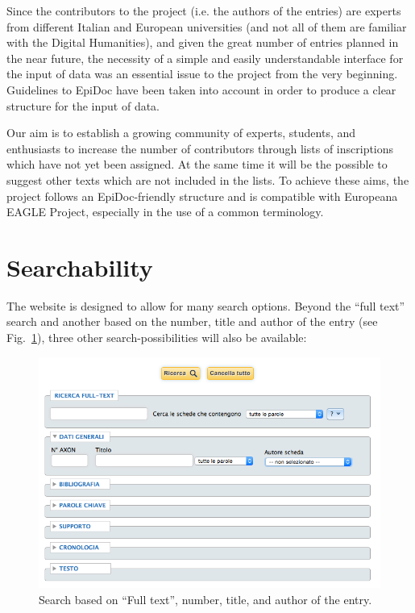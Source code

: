 \documentclass[amsthm,ebook]{saparticle}
\begin{document}
Since the contributors to the project (i.e. the authors of the entries) are experts from different Italian and European
universities (and not all of them are familiar with the Digital Humanities), and given the great number of entries
planned in the near future, the necessity of a simple and easily understandable interface for the input of data was an
essential issue to the project from the very beginning. Guidelines to EpiDoc have been taken into account in order to
produce a clear structure for the input of data.

Our aim is to establish a growing community of experts, students, and enthusiasts to increase the number of contributors
through lists of inscriptions which have not yet been assigned. At the same time it will be the possible to suggest
other texts which are not included in the lists. To achieve these aims, the project follows an EpiDoc-friendly
structure and is compatible with Europeana EAGLE Project, especially in the use of a common terminology. 







\section{Searchability}





The website is designed to allow for many search options. Beyond the ``full text'' search and another based on the number,
title and author of the entry (see Fig.~\ref{fig:3}), three other search-possibilities will also be available:

\begin{figure}[!bp]
\centering
 \includegraphics[width=\columnwidth]{EAGLE2016FullPaperrevised-img003.png}
\caption{Search based on ``Full text'', number, title, and author of the entry.}
\label{fig:3}
\end{figure}
\end{document}
